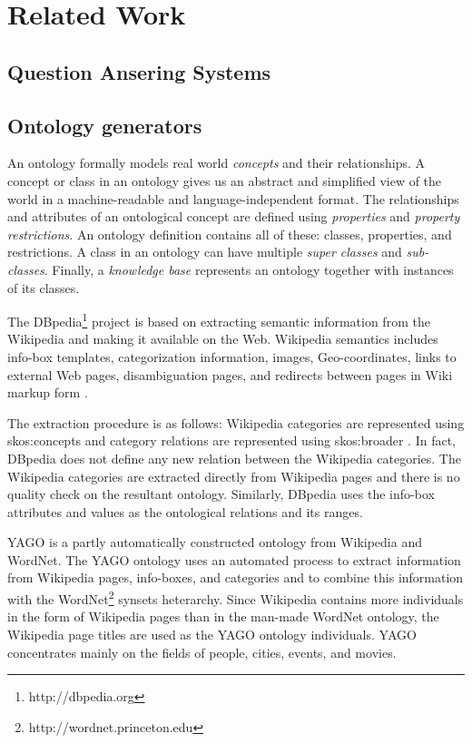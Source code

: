 \section{Related Work}
\label{sec:relatedwork}

\subsection{Question Ansering Systems} 

\subsection{Ontology generators} 

An ontology formally models real world \textit{concepts} and their
relationships. A concept or class in an ontology gives us an abstract and simplified view of the world\cite{Gruber1993} in a machine-readable and
language-independent format. The relationships and attributes of an
ontological concept are defined using \textit{properties} and \textit{property
restrictions}. An ontology definition contains all of
these: classes, properties, and restrictions. A class in an ontology can have
multiple \textit{super classes} and \textit{sub-classes}. Finally, a \textit{knowledge base} represents an ontology together with 
instances of its classes.      

The DBpedia\footnote{http://dbpedia.org} project is based on extracting
semantic information from the Wikipedia and making it available on the
Web. Wikipedia semantics includes info-box templates, categorization
information, images, Geo-coordinates, links to external Web pages,
disambiguation pages, and redirects between pages in Wiki markup form
\cite{Auer07dbpedia:a, Bizer2009}. 

The extraction procedure is as follows: Wikipedia categories are represented
using skos:concepts and category relations are represented using skos:broader
\cite{Auer07dbpedia:a, Bizer2009}. In fact, DBpedia does not define any new
relation between the Wikipedia categories. The Wikipedia categories are
extracted directly from Wikipedia pages and there is no quality check on the
resultant ontology. Similarly, DBpedia uses the info-box attributes and values
as the ontological relations and its ranges.   

YAGO is a partly automatically constructed ontology from Wikipedia and
WordNet\cite{Suchanek2009phd}. The YAGO ontology uses an automated process to
extract information from Wikipedia pages, info-boxes, and categories and to
combine this information with the WordNet\footnote{http://wordnet.princeton.edu} synsets heterarchy. Since Wikipedia contains more individuals in the form of Wikipedia pages than in the man-made WordNet ontology, the Wikipedia page titles are used as the YAGO ontology individuals. YAGO concentrates mainly on the fields of people, cities, events, and movies\cite{Suchanek2009phd}. 

